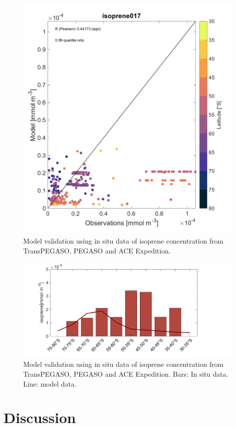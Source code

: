 \documentclass[draft,linenumbers]{agujournal}
\begin{document}
\begin{figure}[h]
\centering
\includegraphics[width=.9\textwidth]{Plots/isoprene_observations_vs_modelo_017_3080_2_Lat_099_PAPER.png}
\caption{Model validation using in situ data of isoprene concentration from TransPEGASO, PEGASO and ACE Expedition.}
\label{fig:validation}
\end{figure}

\begin{figure}
\centering
\includegraphics[width=.9\textwidth]{Plots/isoprene_zonal_avg_DJFM_top50m_SO_d05_017.png}
\caption{Model validation using in situ data of isoprene concentration from TransPEGASO, PEGASO and ACE Expedition. Bars: In situ data. Line: model data.}
\label{fig:validation.lat}
\end{figure}

\section{Discussion}
\end{document}
